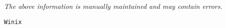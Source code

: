 \label{pkg:winix}

{\tiny \it The above information is manually maintained and may contain errors.}
\begin{verbatim}
Winix
\end{verbatim}
